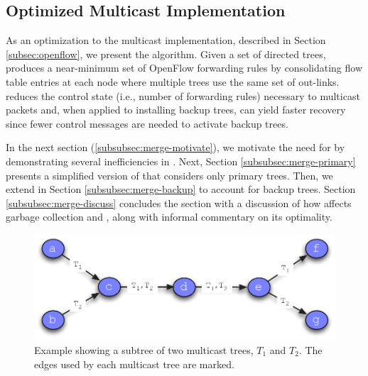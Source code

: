 
\subsection{Optimized Multicast Implementation}
\label{subsec:merge}

As an optimization to the \base multicast implementation, described in Section \ref{subsec:openflow}, we present the \merge algorithm.  
Given a set of directed trees, \merge produces a near-minimum set of OpenFlow forwarding rules by
consolidating flow table entries at each node where multiple trees use the same set of out-links.  \merge reduces the control state (i.e., number of forwarding rules) necessary to 
multicast packets and, when applied to installing backup trees, can yield faster recovery since fewer control messages are needed to activate backup trees.




In the next section (\ref{subsubsec:merge-motivate}), we motivate the need for \merge by demonstrating several inefficiencies in \bases.  Next, Section \ref{subsubsec:merge-primary} 
presents a simplified version of  \merge that considers only primary trees.  Then, we extend
\merge in Section \ref{subsubsec:merge-backup} to account for backup trees.  Section \ref{subsubsec:merge-discuss} concludes the section with a discussion of how \merge affects garbage
collection and \pcnts, along with informal commentary on its optimality.

\begin{figure}
  \centering
   \includegraphics[scale=0.55]{figs/merger-example.pdf}
\caption{Example showing a subtree of two multicast trees, $T_1$ and $T_2$.  The edges used by each multicast tree are marked.}
\label{fig:merger-example}
\end{figure}


